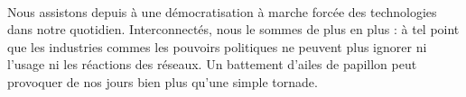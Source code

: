 \paragraph{} Nous assistons depuis à une démocratisation à marche forcée des technologies dans notre quotidien. 
Interconnectés, nous le sommes de plus en plus : à tel point que les industries commes les pouvoirs politiques ne
peuvent plus ignorer ni l'usage ni les réactions des réseaux. Un battement d'ailes de papillon peut provoquer de nos
jours bien plus qu'une simple tornade.